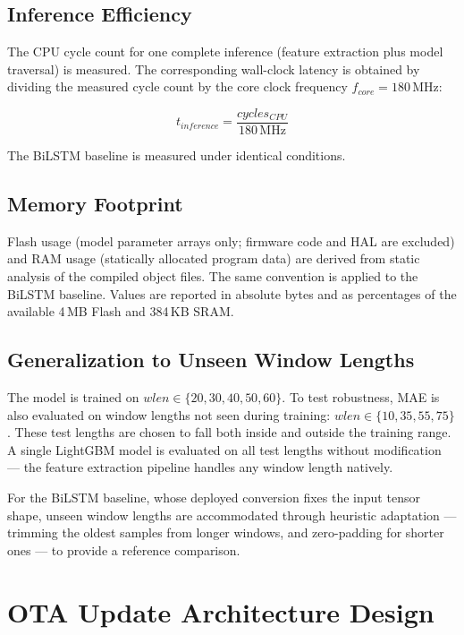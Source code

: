 \subsection{Inference Efficiency}

The CPU cycle count for one complete inference (feature extraction plus model traversal) is measured. The corresponding wall-clock latency is obtained by dividing the measured cycle count by the core clock frequency $f_{core} = 180\,\text{MHz}$:

\begin{equation}
t_{inference} = \frac{cycles_{CPU}}{180\,\text{MHz}}
\end{equation}

The BiLSTM baseline is measured under identical conditions.

\subsection{Memory Footprint}

Flash usage (model parameter arrays only; firmware code and HAL are excluded) and RAM usage (statically allocated program data) are derived from static analysis of the compiled object files. The same convention is applied to the BiLSTM baseline. Values are reported in absolute bytes and as percentages of the available 4\,MB Flash and 384\,KB SRAM.

\subsection{Generalization to Unseen Window Lengths}

The model is trained on $wlen \in \{20, 30, 40, 50, 60\}$. To test robustness, MAE is also evaluated on window lengths not seen during training: $wlen \in \{10, 35, 55, 75\}$. These test lengths are chosen to fall both inside and outside the training range. A single LightGBM model is evaluated on all test lengths without modification --- the feature extraction pipeline handles any window length natively.

For the BiLSTM baseline, whose deployed conversion fixes the input tensor shape, unseen window lengths are accommodated through heuristic adaptation --- trimming the oldest samples from longer windows, and zero-padding for shorter ones --- to provide a reference comparison.


\section{OTA Update Architecture Design}
\label{sec:ch3_ota}

